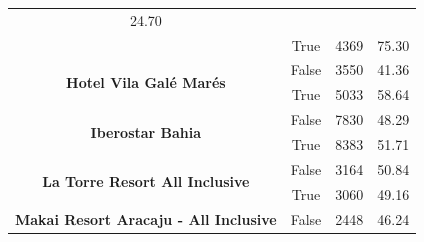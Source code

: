 \begin{table}[]
\begin{tabular}{|c|c|r|r|}
		24.70                                                             \\ \cline{2-4}
		                                                                &
		True                                                            &
		4369                                                            &
		75.30                                                             \\ \hline
		\multirow{2}{*}{\textbf{Hotel Vila Galé Marés}}                 &
		False                                                           &
		3550                                                            &
		41.36                                                             \\ \cline{2-4}
		                                                                &
		True                                                            &
		5033                                                            &
		58.64                                                             \\ \hline
		\multirow{2}{*}{\textbf{Iberostar Bahia}}                       &
		False                                                           &
		7830                                                            &
		48.29                                                             \\ \cline{2-4}
		                                                                &
		True                                                            &
		8383                                                            &
		51.71                                                             \\ \hline
		\multirow{2}{*}{\textbf{La Torre Resort All Inclusive}}         &
		False                                                           &
		3164                                                            &
		50.84                                                             \\ \cline{2-4}
		                                                                &
		True                                                            &
		3060                                                            &
		49.16                                                             \\ \hline
		\multirow{2}{*}{\textbf{Makai Resort Aracaju - All Inclusive}}  &
		False                                                           &
		2448                                                            &
		46.24                                                             \\ \cline{2-4}

\end{tabular}
\end{table}
